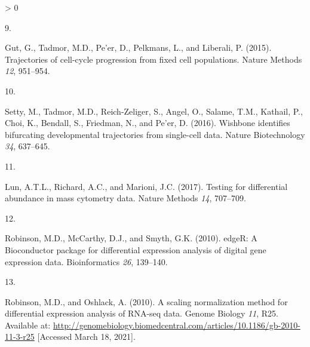 \documentclass[
]{article}
\newlength{\cslhangindent}
\newlength{\csllabelwidth}
\newenvironment{CSLReferences}[2] %
 {%
  \setlength{\parindent}{0pt}
  \ifodd #1 \everypar{\setlength{\hangindent}{\cslhangindent}}\ignorespaces\fi
  \ifnum #2 > 0
  \setlength{\parskip}{#2\baselineskip}
  \fi
 }%
 {}
\newcommand{\CSLLeftMargin}[1]{\parbox[t]{\csllabelwidth}{#1}}
\newcommand{\CSLRightInline}[1]{\parbox[t]{\linewidth - \csllabelwidth}{#1}\break}
\begin{document}
\begin{CSLReferences}{0}{0}
\leavevmode\hypertarget{ref-gutTrajectoriesCellcycleProgression2015}{}%
\CSLLeftMargin{9. }
\CSLRightInline{Gut, G., Tadmor, M.D., Pe'er, D., Pelkmans, L., and Liberali, P. (2015). Trajectories of cell-cycle progression from fixed cell populations. Nature Methods \emph{12}, 951--954.}

\leavevmode\hypertarget{ref-settyWishboneIdentifiesBifurcating2016}{}%
\CSLLeftMargin{10. }
\CSLRightInline{Setty, M., Tadmor, M.D., Reich-Zeliger, S., Angel, O., Salame, T.M., Kathail, P., Choi, K., Bendall, S., Friedman, N., and Pe'er, D. (2016). Wishbone identifies bifurcating developmental trajectories from single-cell data. Nature Biotechnology \emph{34}, 637--645.}

\leavevmode\hypertarget{ref-lunTestingDifferentialAbundance2017}{}%
\CSLLeftMargin{11. }
\CSLRightInline{Lun, A.T.L., Richard, A.C., and Marioni, J.C. (2017). Testing for differential abundance in mass cytometry data. Nature Methods \emph{14}, 707--709.}

\leavevmode\hypertarget{ref-robinsonEdgeRBioconductorPackage2010a}{}%
\CSLLeftMargin{12. }
\CSLRightInline{Robinson, M.D., McCarthy, D.J., and Smyth, G.K. (2010). {edgeR}: A {Bioconductor} package for differential expression analysis of digital gene expression data. Bioinformatics \emph{26}, 139--140.}

\leavevmode\hypertarget{ref-robinsonTMM2010}{}%
\CSLLeftMargin{13. }
\CSLRightInline{Robinson, M.D., and Oshlack, A. (2010). A scaling normalization method for differential expression analysis of {RNA}-seq data. Genome Biology \emph{11}, R25. Available at: \url{http://genomebiology.biomedcentral.com/articles/10.1186/gb-2010-11-3-r25} {[}Accessed March 18, 2021{]}.}

\end{CSLReferences}
\end{document}

